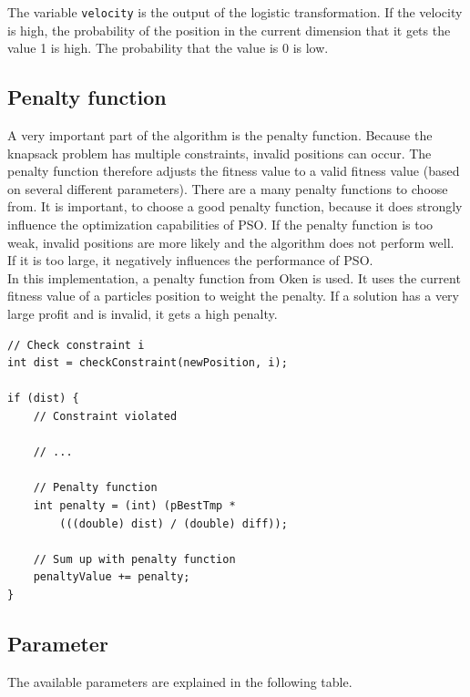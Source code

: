 \documentclass{article}
\begin{document}
The variable \lstinline{velocity} is the output of the logistic transformation. If the velocity is high, the probability of the position in the current dimension that it gets the value 1 is high. The probability that the value is 0 is low.

\subsection{Penalty function}
A very important part of the algorithm is the penalty function. Because the knapsack problem has multiple constraints, invalid positions can occur. The penalty function therefore adjusts the fitness value to a valid fitness value (based on several different parameters). There are a many penalty functions to choose from. It is important, to choose a good penalty function, because it does strongly influence the optimization capabilities of PSO. If the penalty function is too weak, invalid positions are more likely and the algorithm does not perform well. If it is too large, it negatively influences the performance of PSO.\\
In this implementation, a penalty function from Oken \cite{bib-penalty} is used. It uses the current fitness value of a particles position to weight the penalty. If a solution has a very large profit and is invalid, it gets a high penalty.

\begin{lstlisting}[caption="Solver.cpp"]
// Check constraint i
int dist = checkConstraint(newPosition, i);

if (dist) {
	// Constraint violated
	
	// ...
	
	// Penalty function
	int penalty = (int) (pBestTmp *
		(((double) dist) / (double) diff));
		
	// Sum up with penalty function
	penaltyValue += penalty;
}
\end{lstlisting}

\subsection{Parameter}
The available parameters are explained in the following table.\\
\end{document}
